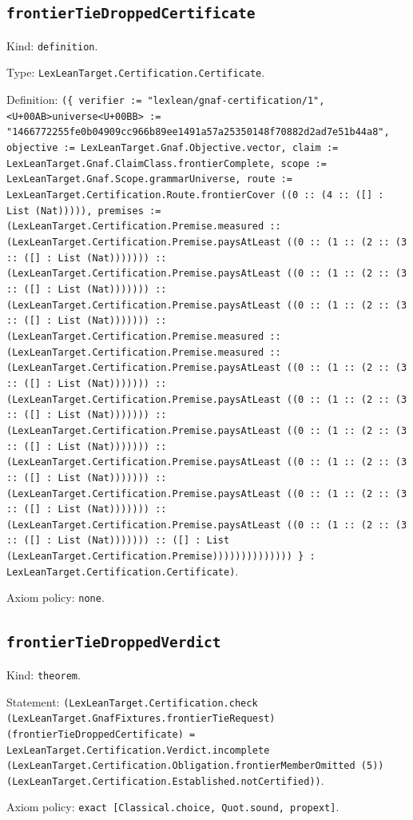 \documentclass[11pt]{article}
\begin{document}
\subsection*{\texttt{frontierTieDroppedCertificate}}
\noindent Kind: \texttt{definition}.\par
\noindent Type: \texttt{LexLeanTarget.Certification.Certificate}.\par
\noindent Definition: \texttt{(\{ verifier := "lexlean/gnaf-certification/1", <U+00AB>universe<U+00BB> := "1466772255fe0b04909cc966b89ee1491a57a25350148f70882d2ad7e51b44a8", objective := LexLeanTarget.Gnaf.Objective.vector, claim := LexLeanTarget.Gnaf.ClaimClass.frontierComplete, scope := LexLeanTarget.Gnaf.Scope.grammarUniverse, route := LexLeanTarget.Certification.Route.frontierCover ((0 :: (4 :: ([] : List (Nat))))), premises := (LexLeanTarget.Certification.Premise.measured :: (LexLeanTarget.Certification.Premise.paysAtLeast ((0 :: (1 :: (2 :: (3 :: ([] : List (Nat))))))) :: (LexLeanTarget.Certification.Premise.paysAtLeast ((0 :: (1 :: (2 :: (3 :: ([] : List (Nat))))))) :: (LexLeanTarget.Certification.Premise.paysAtLeast ((0 :: (1 :: (2 :: (3 :: ([] : List (Nat))))))) :: (LexLeanTarget.Certification.Premise.measured :: (LexLeanTarget.Certification.Premise.measured :: (LexLeanTarget.Certification.Premise.paysAtLeast ((0 :: (1 :: (2 :: (3 :: ([] : List (Nat))))))) :: (LexLeanTarget.Certification.Premise.paysAtLeast ((0 :: (1 :: (2 :: (3 :: ([] : List (Nat))))))) :: (LexLeanTarget.Certification.Premise.paysAtLeast ((0 :: (1 :: (2 :: (3 :: ([] : List (Nat))))))) :: (LexLeanTarget.Certification.Premise.paysAtLeast ((0 :: (1 :: (2 :: (3 :: ([] : List (Nat))))))) :: (LexLeanTarget.Certification.Premise.paysAtLeast ((0 :: (1 :: (2 :: (3 :: ([] : List (Nat))))))) :: (LexLeanTarget.Certification.Premise.paysAtLeast ((0 :: (1 :: (2 :: (3 :: ([] : List (Nat))))))) :: ([] : List (LexLeanTarget.Certification.Premise)))))))))))))) \} : LexLeanTarget.Certification.Certificate)}.\par
\noindent Axiom policy: \texttt{none}.\par
\subsection*{\texttt{frontierTieDroppedVerdict}}
\noindent Kind: \texttt{theorem}.\par
\noindent Statement: \texttt{(LexLeanTarget.Certification.check (LexLeanTarget.GnafFixtures.frontierTieRequest) (frontierTieDroppedCertificate) = LexLeanTarget.Certification.Verdict.incomplete (LexLeanTarget.Certification.Obligation.frontierMemberOmitted (5)) (LexLeanTarget.Certification.Established.notCertified))}.\par
\noindent Axiom policy: \texttt{exact [Classical.choice, Quot.sound, propext]}.\par
\end{document}

